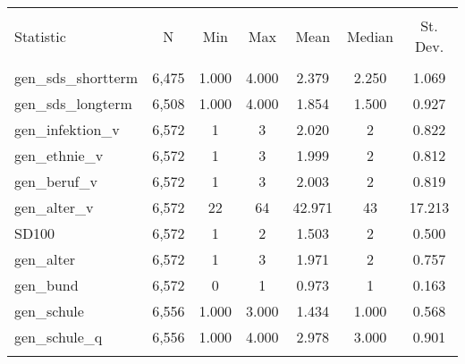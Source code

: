 
\begin{table}[!htbp] \centering 
  \caption{} 
  \label{} 
\begin{tabular}{@{\extracolsep{5pt}}lcccccc} 
\\[-1.8ex]\hline 
\hline \\[-1.8ex] 
Statistic & \multicolumn{1}{c}{N} & \multicolumn{1}{c}{Min} & \multicolumn{1}{c}{Max} & \multicolumn{1}{c}{Mean} & \multicolumn{1}{c}{Median} & \multicolumn{1}{c}{St. Dev.} \\ 
\hline \\[-1.8ex] 
gen\_sds\_shortterm & 6,475 & 1.000 & 4.000 & 2.379 & 2.250 & 1.069 \\ 
gen\_sds\_longterm & 6,508 & 1.000 & 4.000 & 1.854 & 1.500 & 0.927 \\ 
gen\_infektion\_v & 6,572 & 1 & 3 & 2.020 & 2 & 0.822 \\ 
gen\_ethnie\_v & 6,572 & 1 & 3 & 1.999 & 2 & 0.812 \\ 
gen\_beruf\_v & 6,572 & 1 & 3 & 2.003 & 2 & 0.819 \\ 
gen\_alter\_v & 6,572 & 22 & 64 & 42.971 & 43 & 17.213 \\ 
SD100 & 6,572 & 1 & 2 & 1.503 & 2 & 0.500 \\ 
gen\_alter & 6,572 & 1 & 3 & 1.971 & 2 & 0.757 \\ 
gen\_bund & 6,572 & 0 & 1 & 0.973 & 1 & 0.163 \\ 
gen\_schule & 6,556 & 1.000 & 3.000 & 1.434 & 1.000 & 0.568 \\ 
gen\_schule\_q & 6,556 & 1.000 & 4.000 & 2.978 & 3.000 & 0.901 \\ 
\hline \\[-1.8ex] 
\end{tabular} 
\end{table} 
